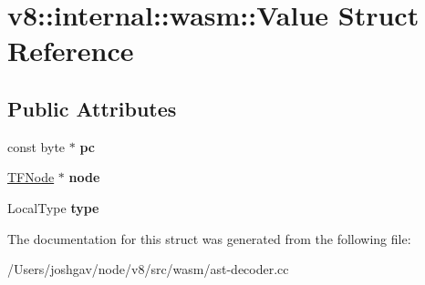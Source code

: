 \hypertarget{structv8_1_1internal_1_1wasm_1_1_value}{}\section{v8\+:\+:internal\+:\+:wasm\+:\+:Value Struct Reference}
\label{structv8_1_1internal_1_1wasm_1_1_value}
\subsection*{Public Attributes}
\begin{DoxyCompactItemize}
\item 
const byte $\ast$ {\bfseries pc}\hypertarget{structv8_1_1internal_1_1wasm_1_1_value_a74cfc6a72a57a94b2560e0faec6a53d7}{}\label{structv8_1_1internal_1_1wasm_1_1_value_a74cfc6a72a57a94b2560e0faec6a53d7}

\item 
\hyperlink{classv8_1_1internal_1_1compiler_1_1_node}{T\+F\+Node} $\ast$ {\bfseries node}\hypertarget{structv8_1_1internal_1_1wasm_1_1_value_a529075e42c64b56fbbea2fc7163fdaf8}{}\label{structv8_1_1internal_1_1wasm_1_1_value_a529075e42c64b56fbbea2fc7163fdaf8}

\item 
Local\+Type {\bfseries type}\hypertarget{structv8_1_1internal_1_1wasm_1_1_value_a508d811ac28f0576911b19e48e2953dd}{}\label{structv8_1_1internal_1_1wasm_1_1_value_a508d811ac28f0576911b19e48e2953dd}

\end{DoxyCompactItemize}


The documentation for this struct was generated from the following file\+:\begin{DoxyCompactItemize}
\item 
/\+Users/joshgav/node/v8/src/wasm/ast-\/decoder.\+cc\end{DoxyCompactItemize}

